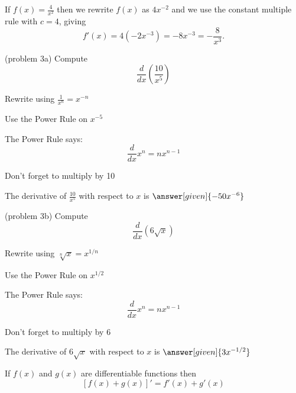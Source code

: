 \documentclass{ximera}
\begin{document}
\begin{example}[example 3]
 If $f(x) = \frac{4}{x^2}$ then we rewrite $f(x)$ as $4x^{-2}$  and we use the constant multiple rule with $c = 4$, 
giving 
\[f'(x) = 4 (-2x^{-3}) = -8x^{-3} = -\frac{8}{x^3}.
\]
\end{example}

\begin{problem}(problem 3a)
  Compute 
  \[
  \frac{d}{dx} \left(\frac{10}{x^5}\right)
  \]
  
    \begin{hint}
		  Rewrite using $\frac{1}{x^n} = x^{-n}$
		\end{hint}
		\begin{hint}
      Use the Power Rule on $x^{-5}$
    \end{hint}
    \begin{hint}
      The Power Rule says:
      \[
      \frac{d}{dx} x^n = nx^{n-1}
      \]
    \end{hint}
		\begin{hint}
		  Don't forget to multiply by 10
		\end{hint}
		
		The derivative of $\frac{10}{x^5}$ with respect to $x$ is
		 $\answer[given]{-50x^{-6}}$
	
\end{problem}


\begin{problem}(problem 3b)
  Compute 
  \[
  \frac{d}{dx} \left(6\sqrt x\right)
  \]
  
    \begin{hint}
		  Rewrite using $\sqrt[n] x = x^{1/n}$
		\end{hint}
		\begin{hint}
      Use the Power Rule on $x^{1/2}$
    \end{hint}
    \begin{hint}
      The Power Rule says:
      \[
      \frac{d}{dx} x^n = nx^{n-1}
      \]
    \end{hint}
		\begin{hint}
		  Don't forget to multiply by 6
		\end{hint}
		
		The derivative of $6\sqrt x$ with respect to $x$ is
		 $\answer[given]{3x^{-1/2}}$
	
\end{problem}


\begin{theorem} If $f(x)$ and $g(x)$ are differentiable functions then
\[[f(x) + g(x)]' =  f'(x) +  g'(x)\]
\end{theorem}
\end{document}
